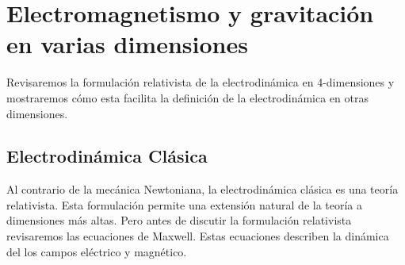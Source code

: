 \chapter{Electromagnetismo y gravitación en varias dimensiones}\label{cap:3}
Revisaremos la formulación relativista de la electrodinámica en 4-dimensiones y mostraremos cómo esta facilita la definición de la electrodinámica en otras dimensiones.

\section{Electrodinámica Clásica}\label{sec:3.1}
Al contrario de la mecánica Newtoniana, la electrodinámica clásica es una teoría relativista. Esta formulación permite una extensión natural de la teoría a dimensiones más altas. Pero antes de discutir la formulación relativista revisaremos las ecuaciones de Maxwell. Estas ecuaciones describen la dinámica del los campos eléctrico y magnético.

